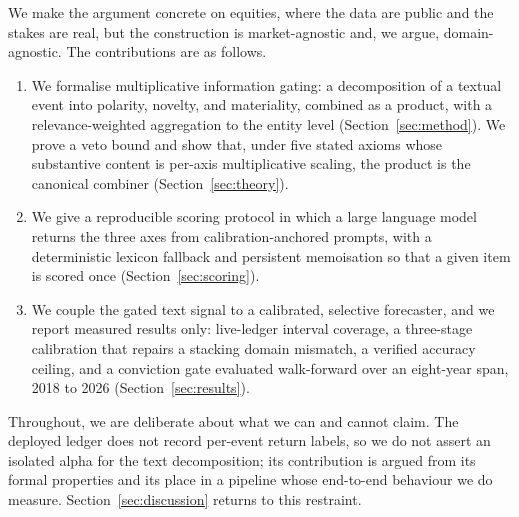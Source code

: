 \documentclass{elektr}
\begin{document}
We make the argument concrete on equities, where the data are public and the stakes are real, but the construction is market-agnostic and, we argue, domain-agnostic. The contributions are as follows.
\begin{enumerate}
\item We formalise multiplicative information gating: a decomposition of a textual event into polarity, novelty, and materiality, combined as a product, with a relevance-weighted aggregation to the entity level (Section~\ref{sec:method}). We prove a veto bound and show that, under five stated axioms whose substantive content is per-axis multiplicative scaling, the product is the canonical combiner (Section~\ref{sec:theory}).
\item We give a reproducible scoring protocol in which a large language model returns the three axes from calibration-anchored prompts, with a deterministic lexicon fallback and persistent memoisation so that a given item is scored once (Section~\ref{sec:scoring}).
\item We couple the gated text signal to a calibrated, selective forecaster, and we report measured results only: live-ledger interval coverage, a three-stage calibration that repairs a stacking domain mismatch, a verified accuracy ceiling, and a conviction gate evaluated walk-forward over an eight-year span, 2018 to 2026 (Section~\ref{sec:results}).
\end{enumerate}
Throughout, we are deliberate about what we can and cannot claim. The deployed ledger does not record per-event return labels, so we do not assert an isolated alpha for the text decomposition; its contribution is argued from its formal properties and its place in a pipeline whose end-to-end behaviour we do measure. Section~\ref{sec:discussion} returns to this restraint.

\end{document}
